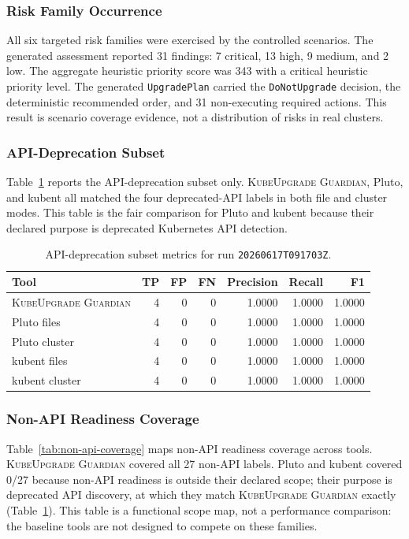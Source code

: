 \documentclass[10pt,journal]{IEEEtran}
\newcommand{\tool}{\textsc{KubeUpgrade Guardian}}
\newcommand{\crd}[1]{\texttt{#1}}
\newcommand{\code}[1]{\texttt{#1}}
\begin{document}
\subsubsection*{Risk Family Occurrence}
All six targeted risk families were exercised by the controlled scenarios. The generated assessment reported 31 findings: 7 critical, 13 high, 9 medium, and 2 low. The aggregate heuristic priority score was 343 with a critical heuristic priority level. The generated \crd{UpgradePlan} carried the \code{DoNotUpgrade} decision, the deterministic recommended order, and 31 non-executing required actions. This result is scenario coverage evidence, not a distribution of risks in real clusters.

\subsubsection*{API-Deprecation Subset}
Table~\ref{tab:api-subset} reports the API-deprecation subset only. \tool{}, Pluto, and kubent all matched the four deprecated-API labels in both file and cluster modes. This table is the fair comparison for Pluto and kubent because their declared purpose is deprecated Kubernetes API detection.

\begin{table}[t]
  \centering
  \caption{API-deprecation subset metrics for run \code{20260617T091703Z}.}
  \label{tab:api-subset}
  \begin{tabular}{lrrrrrr}
    \toprule
    Tool & TP & FP & FN & Precision & Recall & F1 \\
    \midrule
    \tool{} & 4 & 0 & 0 & 1.0000 & 1.0000 & 1.0000 \\
    Pluto files & 4 & 0 & 0 & 1.0000 & 1.0000 & 1.0000 \\
    Pluto cluster & 4 & 0 & 0 & 1.0000 & 1.0000 & 1.0000 \\
    kubent files & 4 & 0 & 0 & 1.0000 & 1.0000 & 1.0000 \\
    kubent cluster & 4 & 0 & 0 & 1.0000 & 1.0000 & 1.0000 \\
    \bottomrule
  \end{tabular}
\end{table}

\subsubsection*{Non-API Readiness Coverage}
Table~\ref{tab:non-api-coverage} maps non-API readiness coverage across tools. \tool{} covered all 27 non-API labels. Pluto and kubent covered 0/27 because non-API readiness is outside their declared scope; their purpose is deprecated API discovery, at which they match \tool{} exactly (Table~\ref{tab:api-subset}). This table is a functional scope map, not a performance comparison: the baseline tools are not designed to compete on these families.
\end{document}
